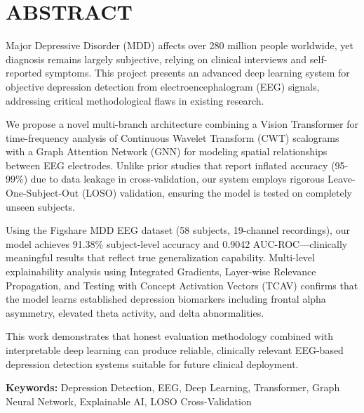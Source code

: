 \documentclass[12pt,a4paper,oneside]{report}
\begin{document}


\chapter*{ABSTRACT}

Major Depressive Disorder (MDD) affects over 280 million people worldwide, yet diagnosis remains largely subjective, relying on clinical interviews and self-reported symptoms. This project presents an advanced deep learning system for objective depression detection from electroencephalogram (EEG) signals, addressing critical methodological flaws in existing research.

We propose a novel multi-branch architecture combining a Vision Transformer for time-frequency analysis of Continuous Wavelet Transform (CWT) scalograms with a Graph Attention Network (GNN) for modeling spatial relationships between EEG electrodes. Unlike prior studies that report inflated accuracy (95-99\%) due to data leakage in cross-validation, our system employs rigorous Leave-One-Subject-Out (LOSO) validation, ensuring the model is tested on completely unseen subjects.

Using the Figshare MDD EEG dataset (58 subjects, 19-channel recordings), our model achieves 91.38\% subject-level accuracy and 0.9042 AUC-ROC---clinically meaningful results that reflect true generalization capability. Multi-level explainability analysis using Integrated Gradients, Layer-wise Relevance Propagation, and Testing with Concept Activation Vectors (TCAV) confirms that the model learns established depression biomarkers including frontal alpha asymmetry, elevated theta activity, and delta abnormalities.

This work demonstrates that honest evaluation methodology combined with interpretable deep learning can produce reliable, clinically relevant EEG-based depression detection systems suitable for future clinical deployment.

\textbf{Keywords:} Depression Detection, EEG, Deep Learning, Transformer, Graph Neural Network, Explainable AI, LOSO Cross-Validation

\newpage

\tableofcontents
\newpage
\end{document}
